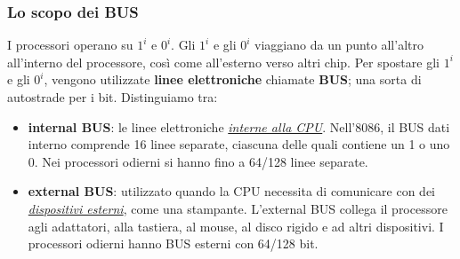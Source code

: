 %	
%		
%	

\begin{frame}
	\frametitle{Lo scopo dei BUS}
	
	\begin{block}{}
		I processori operano su $1^i$ e $0^i$. Gli $1^i$ e gli $0^i$ viaggiano da un punto all'altro all'interno del processore, così come all'esterno verso altri chip.
		Per spostare gli $1^i$ e gli $0^i$, vengono utilizzate \textbf{linee elettroniche} chiamate \textbf{BUS}; una sorta di autostrade per i bit. Distinguiamo tra:
		\begin{itemize}
			\item \textbf{internal BUS}: le linee elettroniche \textit{	\underline{interne alla CPU}}. Nell'8086, il BUS dati interno comprende 16 linee separate, ciascuna delle quali contiene un 1 o uno 0. Nei processori odierni si hanno fino a 64/128 linee separate.
			\item \textbf{external BUS}: utilizzato quando la CPU necessita di comunicare con dei \textit{\underline{dispositivi esterni}}, come una stampante. L'external BUS collega il processore agli adattatori, alla tastiera, al mouse, al disco rigido e ad altri dispositivi.
				I processori odierni hanno BUS esterni con 64/128 bit.
		\end{itemize}
		
	\end{block}
	
\end{frame}


